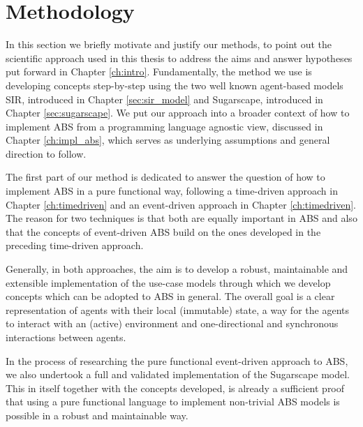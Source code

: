 \chapter{Methodology}


In this section we briefly motivate and justify our methods, to point out the scientific approach used in this thesis to address the aims and answer hypotheses put forward in Chapter \ref{ch:intro}. Fundamentally, the method we use is developing concepts step-by-step using the two well known agent-based models SIR, introduced in Chapter \ref{sec:sir_model} and Sugarscape, introduced in Chapter \ref{sec:sugarscape}. We put our approach into a broader context of how to implement ABS from a programming language agnostic view, discussed in Chapter \ref{ch:impl_abs}, which serves as underlying assumptions and general direction to follow.

The first part of our method is dedicated to answer the question of how to implement ABS in a pure functional way, following a time-driven approach in Chapter \ref{ch:timedriven} and an event-driven approach in Chapter \ref{ch:timedriven}. The reason for two techniques is that both are equally important in ABS and also that the concepts of event-driven ABS build on the ones developed in the preceding time-driven approach.

Generally, in both approaches, the aim is to develop a robust, maintainable and extensible implementation of the use-case models through which we develop concepts which can be adopted to ABS in general. The overall goal is a clear representation of agents with their local (immutable) state, a way for the agents to interact with an (active) environment and one-directional and synchronous interactions between agents. 

In the process of researching the pure functional event-driven approach to ABS, we also undertook a full and validated implementation of the Sugarscape model. This in itself together with the concepts developed, is already a sufficient proof that using a pure functional language to implement non-trivial ABS models is possible in a robust and maintainable way.

